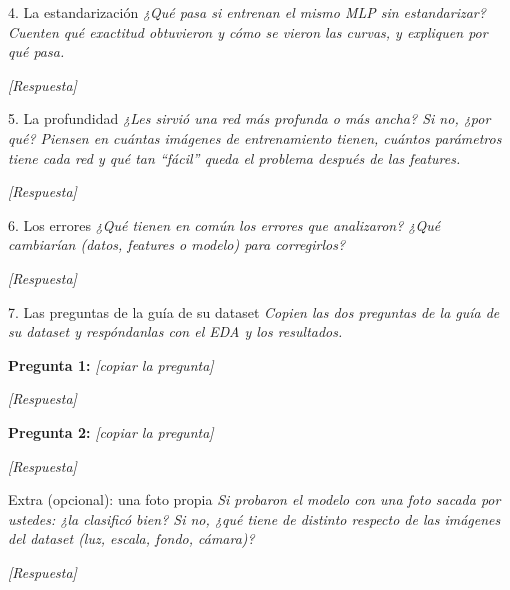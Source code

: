 \documentclass[11pt,a4paper]{article}
\newcommand{\completar}[1]{\textcolor{gris}{\textit{[#1]}}}
\begin{document}
\begin{respuesta}{4. La estandarización}
  \textit{¿Qué pasa si entrenan el mismo MLP sin estandarizar? Cuenten qué exactitud obtuvieron y cómo se vieron las curvas, y expliquen por qué pasa.}\par\medskip
  \completar{Respuesta}
\end{respuesta}
 
\begin{respuesta}{5. La profundidad}
  \textit{¿Les sirvió una red más profunda o más ancha? Si no, ¿por qué? Piensen en cuántas imágenes de entrenamiento tienen, cuántos parámetros tiene cada red y qué tan ``fácil'' queda el problema después de las features.}\par\medskip
  \completar{Respuesta}
\end{respuesta}
 
\begin{respuesta}{6. Los errores}
  \textit{¿Qué tienen en común los errores que analizaron? ¿Qué cambiarían (datos, features o modelo) para corregirlos?}\par\medskip
  \completar{Respuesta}
\end{respuesta}
 
\begin{respuesta}{7. Las preguntas de la guía de su dataset}
  \textit{Copien las dos preguntas de la guía de su dataset y respóndanlas con el EDA y los resultados.}\par\medskip
  \textbf{Pregunta 1:} \completar{copiar la pregunta}\par
  \completar{Respuesta}\par\medskip
  \textbf{Pregunta 2:} \completar{copiar la pregunta}\par
  \completar{Respuesta}
\end{respuesta}
 
\begin{respuesta}{Extra (opcional): una foto propia}
  \textit{Si probaron el modelo con una foto sacada por ustedes: ¿la clasificó bien? Si no, ¿qué tiene de distinto respecto de las imágenes del dataset (luz, escala, fondo, cámara)?}\par\medskip
  \completar{Respuesta}
\end{respuesta}
 
 
\end{document}
